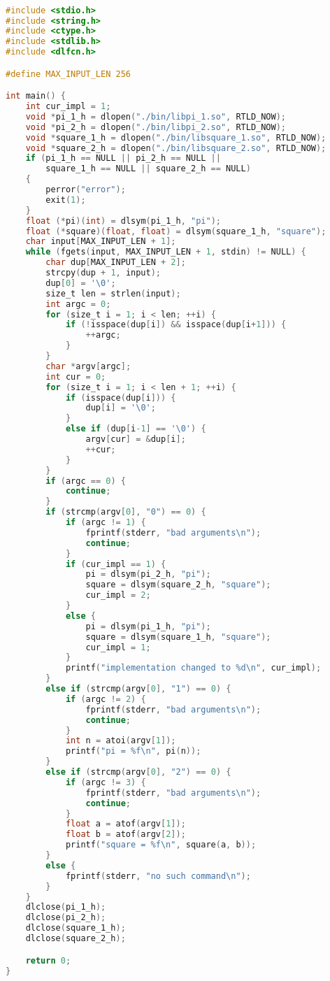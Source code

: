 \begin{lstlisting}[language=C]

#include <stdio.h>
#include <string.h>
#include <ctype.h>
#include <stdlib.h>
#include <dlfcn.h>

#define MAX_INPUT_LEN 256

int main() {
    int cur_impl = 1;
    void *pi_1_h = dlopen("./bin/libpi_1.so", RTLD_NOW);
    void *pi_2_h = dlopen("./bin/libpi_2.so", RTLD_NOW);
    void *square_1_h = dlopen("./bin/libsquare_1.so", RTLD_NOW);
    void *square_2_h = dlopen("./bin/libsquare_2.so", RTLD_NOW);
    if (pi_1_h == NULL || pi_2_h == NULL ||
        square_1_h == NULL || square_2_h == NULL) 
    {
        perror("error");
        exit(1);
    }
    float (*pi)(int) = dlsym(pi_1_h, "pi");
    float (*square)(float, float) = dlsym(square_1_h, "square");
    char input[MAX_INPUT_LEN + 1];
    while (fgets(input, MAX_INPUT_LEN + 1, stdin) != NULL) {
        char dup[MAX_INPUT_LEN + 2];
        strcpy(dup + 1, input);
        dup[0] = '\0';
        size_t len = strlen(input);
        int argc = 0;
        for (size_t i = 1; i < len; ++i) {
            if (!isspace(dup[i]) && isspace(dup[i+1])) {
                ++argc;
            }
        }
        char *argv[argc];
        int cur = 0;
        for (size_t i = 1; i < len + 1; ++i) {
            if (isspace(dup[i])) {
                dup[i] = '\0';
            }
            else if (dup[i-1] == '\0') {
                argv[cur] = &dup[i];
                ++cur;
            }
        }
        if (argc == 0) {
            continue;
        }
        if (strcmp(argv[0], "0") == 0) {
            if (argc != 1) {
                fprintf(stderr, "bad arguments\n");
                continue;
            }
            if (cur_impl == 1) {
                pi = dlsym(pi_2_h, "pi");
                square = dlsym(square_2_h, "square");
                cur_impl = 2;
            }
            else {
                pi = dlsym(pi_1_h, "pi");
                square = dlsym(square_1_h, "square");
                cur_impl = 1;
            }
            printf("implementation changed to %d\n", cur_impl);
        }
        else if (strcmp(argv[0], "1") == 0) {
            if (argc != 2) {
                fprintf(stderr, "bad arguments\n");
                continue;
            }
            int n = atoi(argv[1]);
            printf("pi = %f\n", pi(n));
        }
        else if (strcmp(argv[0], "2") == 0) {
            if (argc != 3) {
                fprintf(stderr, "bad arguments\n");
                continue;
            }
            float a = atof(argv[1]);
            float b = atof(argv[2]);
            printf("square = %f\n", square(a, b));
        }
        else {
            fprintf(stderr, "no such command\n");
        }
    }
    dlclose(pi_1_h);
    dlclose(pi_2_h);
    dlclose(square_1_h);
    dlclose(square_2_h);

    return 0;
}

\end{lstlisting}

\pagebreak